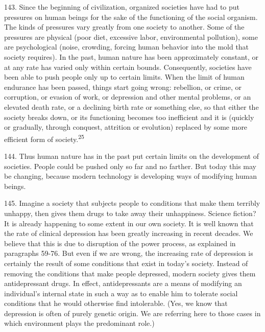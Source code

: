 \documentclass{article}
\begin{document}
\hspace{0.5cm} 143.  Since the beginning of civilization, organized societies have had to put pressures on human 
beings for the sake of the functioning of the social organism.  The kinds of pressures vary greatly 
from  one  society  to  another.   Some  of  the  pressures  are  physical  (poor  diet,  excessive  labor,  
environmental pollution), some are psychological (noise, crowding, forcing human behavior into 
the mold that society requires).  In the past, human nature has been approximately constant, or at 
any  rate has varied only  within certain bounds.   Consequently, societies have been able to push 
people only up to certain limits.  When the limit of human endurance has been passed, things start 
going wrong: rebellion, or crime, or corruption, or evasion of work, or depression and other mental 
problems, or an elevated death rate, or a declining birth rate or something else, so that either the 
society  breaks  down,  or  its  functioning  becomes  too  inefficient  and  it  is  (quickly  or  gradually,  
through conquest, attrition or evolution) replaced by some more efficient form of society.\textsuperscript{25} \vspace{\baselineskip}

144.  Thus human nature has in the past put certain limits on the development of societies.  People 
could  be  pushed  only  so  far  and  no  farther.   But  today  this  may  be  changing,  because  modern  
technology is developing ways of modifying human beings. \vspace{\baselineskip}

145.  Imagine a society that subjects people to conditions that make them terribly unhappy, then 
gives them drugs to take away their unhappiness.  Science fiction? It is already happening to some 
extent in our own society.   It is well known that the rate of clinical depression has been greatly 
increasing  in  recent  decades.   We  believe  that  this  is  due to  disruption  of the  power  process,  as  
explained  in  paragraphs  59-76.  But  even  if  we  are  wrong,  the  increasing  rate  of  depression  is  
certainly  the  result  of  some  conditions  that  exist  in  today’s  society.   Instead  of  removing  the  
conditions that make people depressed, modern society gives them antidepressant drugs.  In effect, 
antidepressants are a means of modifying an individual’s internal state in such a way as to enable 
him  to  tolerate  social  conditions  that  he  would  otherwise  find  intolerable.   (Yes,  we  know  that  
depression  is  often  of  purely  genetic  origin.   We  are  referring  here  to  those  cases  in  which  
environment plays the predominant role.) \vspace{\baselineskip}
\end{document}
